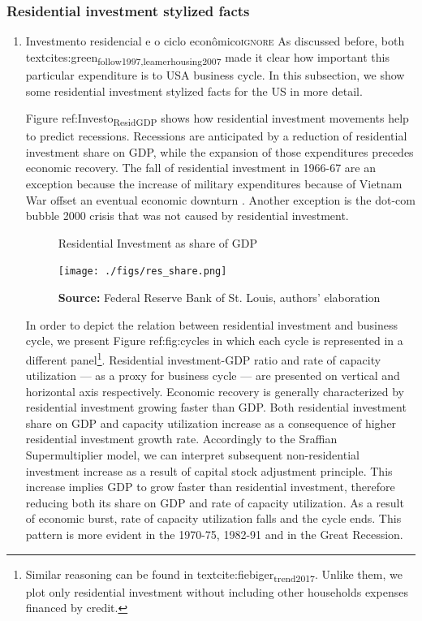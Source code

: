 \documentclass[12pt]{article}
\begin{document}
\subsubsection{Residential investment stylized facts}
\label{sec:org1e5eb79}

\begin{enumerate}
\item Investmento residencial e o ciclo econômico\hfill{}\textsc{ignore}
\label{sec:org94fcb06}
As discussed before, both textcites:green\textsubscript{follow}\textsubscript{1997,leamer}\textsubscript{housing}\textsubscript{2007} made it clear how important this particular expenditure is to USA business cycle. In this subsection, we show some residential investment stylized facts for the US in more detail.

Figure ref:Investo\textsubscript{Resid}\textsubscript{GDP} shows how residential investment movements help to predict recessions. Recessions are anticipated by a reduction of residential investment share on GDP, while the expansion of those expenditures precedes economic recovery. The fall of residential investment in 1966-67 are an exception because the increase of military expenditures because of Vietnam War offset an eventual economic downturn \cite[p.~20]{leamer_housing_2007}. Another exception is the dot-com bubble 2000 crisis that was not caused by residential investment.



\begin{figure}[htb]
    \centering
        \caption{Residential Investment as share of GDP}
        \label{Investo_Resid_GDP}
    \texttt{[image: ./figs/res\_share.png]}
    \caption*{\textbf{Source:} Federal Reserve Bank of St. Louis, authors’ elaboration}
\end{figure}

In order to depict the relation between residential investment and business cycle, we present Figure ref:fig:cycles in which each cycle is represented in a different panel\footnote{Similar reasoning can be found in textcite:fiebiger\textsubscript{trend}\textsubscript{2017}. Unlike them, we plot only residential investment without including other households expenses financed by credit.}.
Residential investment-GDP ratio and rate of capacity utilization --- as a proxy for business cycle --- are presented on vertical and horizontal axis respectively.
Economic recovery is generally characterized by residential investment growing faster than GDP. Both residential investment share on GDP and capacity utilization increase as a consequence of higher residential investment growth rate.
Accordingly to the Sraffian Supermultiplier model, we can interpret subsequent non-residential investment increase as a result of capital stock adjustment principle. 
This increase implies GDP to grow faster than residential investment, therefore reducing both its share on GDP and rate of capacity utilization.
As a result of economic burst, rate of capacity utilization falls and the cycle ends.
This pattern is more evident in the 1970-75, 1982-91 and in the Great Recession.



\end{enumerate}
\end{document}
